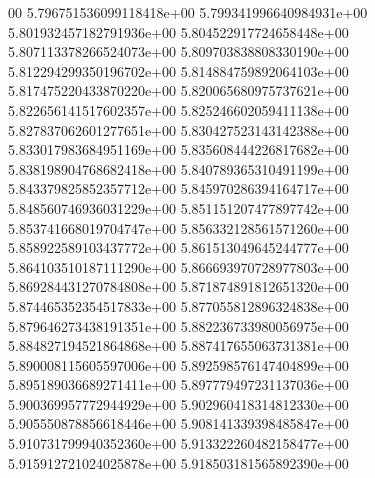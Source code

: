 00	5.796751536099118418e+00	5.799341996640984931e+00	5.801932457182791936e+00	5.804522917724658448e+00	5.807113378266524073e+00	5.809703838808330190e+00	5.812294299350196702e+00	5.814884759892064103e+00	5.817475220433870220e+00	5.820065680975737621e+00	5.822656141517602357e+00	5.825246602059411138e+00	5.827837062601277651e+00	5.830427523143142388e+00	5.833017983684951169e+00	5.835608444226817682e+00	5.838198904768682418e+00	5.840789365310491199e+00	5.843379825852357712e+00	5.845970286394164717e+00	5.848560746936031229e+00	5.851151207477897742e+00	5.853741668019704747e+00	5.856332128561571260e+00	5.858922589103437772e+00	5.861513049645244777e+00	5.864103510187111290e+00	5.866693970728977803e+00	5.869284431270784808e+00	5.871874891812651320e+00	5.874465352354517833e+00	5.877055812896324838e+00	5.879646273438191351e+00	5.882236733980056975e+00	5.884827194521864868e+00	5.887417655063731381e+00	5.890008115605597006e+00	5.892598576147404899e+00	5.895189036689271411e+00	5.897779497231137036e+00	5.900369957772944929e+00	5.902960418314812330e+00	5.905550878856618446e+00	5.908141339398485847e+00	5.910731799940352360e+00	5.913322260482158477e+00	5.915912721024025878e+00	5.918503181565892390e+00
